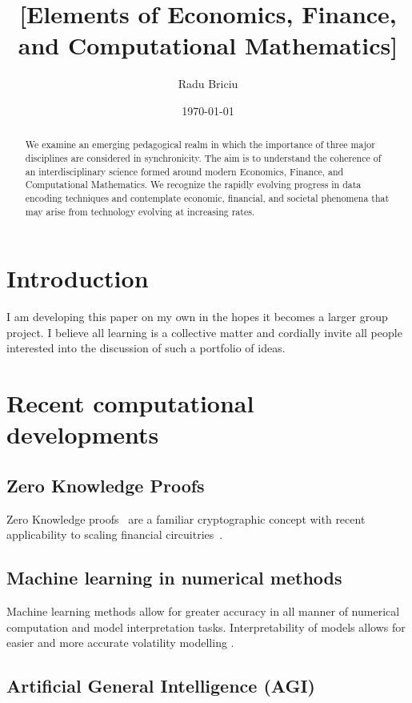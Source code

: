 \documentclass[11pt]{article}
\title{[Elements of Economics, Finance, and Computational Mathematics]}
\date{\today}
\author{Radu Briciu}
\begin{document}
\nocite{*}
\maketitle
\newpage
\begin{abstract}
	\noindent
	We examine an emerging pedagogical realm in which the importance of three major disciplines are considered in synchronicity. The aim is to understand the coherence of an interdisciplinary science formed around modern Economics, Finance, and Computational Mathematics. We recognize the rapidly evolving progress in data encoding techniques and contemplate economic, financial, and societal phenomena that may arise from technology evolving at increasing rates.
\end{abstract}


\newpage
\tableofcontents	
\newpage

\section{Introduction}
I am developing this paper on my own in the hopes it becomes a larger group project. I believe all learning is a collective matter and cordially invite all people interested into the discussion of such a portfolio of ideas.

\section{Recent computational developments}
\subsection{Zero Knowledge Proofs}
Zero Knowledge proofs~\cite{ernstberger_2024_do} are a familiar cryptographic concept with recent applicability to scaling financial circuitries~\cite{leethorp_2022_fnet}.
\subsection{Machine learning in numerical methods}
Machine learning methods allow for greater accuracy in all manner of numerical computation and model interpretation tasks. Interpretability of models allows for easier and more accurate volatility modelling \cite{beck_2019_machine} \cite{parr_2021_partial} \cite{yuan_2024_deep}.
\subsection{Artificial General Intelligence (AGI)}
\end{document}
